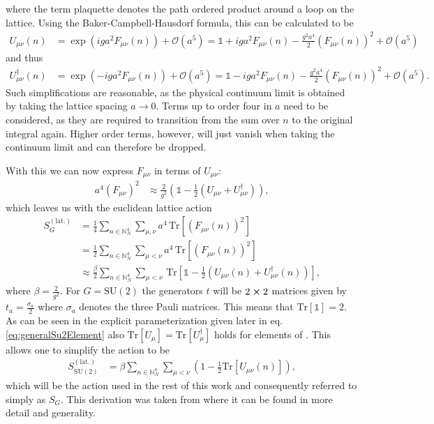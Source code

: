 where the term plaquette denotes the path ordered product around a loop on the lattice. Using the Baker-Campbell-Hausdorf formula, this can be calculated to be
\begin{align*}
 U_{\mu \nu}(n) & = \exp \left( iga^2 F_{\mu \nu} (n) \right) + \mathcal{O}(a^5) = \mathbb{1} + i g a^2 F_{\mu \nu} (n) - \frac{g^2 a^4}{2} (F_{\mu \nu} (n))^2 + \mathcal{O}(a^5)
\end{align*}
and thus
\begin{align*}
 U_{\mu \nu}^\dagger(n) & = \exp \left( - iga^2 F_{\mu \nu} (n) \right) + \mathcal{O}(a^5) = \mathbb{1} - i g a^2 F_{\mu \nu} (n) - \frac{g^2 a^4}{2} (F_{\mu \nu} (n) )^2 + \mathcal{O}(a^5) \textrm{.}
\end{align*}
Such simplifications are reasonable, as the physical continuum limit is obtained by taking the lattice spacing $a \rightarrow 0$. Terms up to order four in $a$ need to be considered, as they are required to transition from the sum over $n$ to the original integral again. Higher order terms, however, will just vanish when taking the continuum limit and can therefore be dropped.

With this we can now express $F_{\mu \nu}$ in terms of $U_{\mu \nu}$:
\begin{align*}
 a^4 (F_{\mu \nu})^2 & \approx \frac{2}{g^2} \left( \mathbb{1} - \frac{1}{2}\left( U_{\mu \nu} + U_{\mu \nu}^\dagger \right) \right) \textrm{,}
\end{align*}
which leaves us with the euclidean lattice action
\begin{align*}
 S^{(\textrm{lat.})}_G & = \frac{1}{4} \sum_{n \in \mathbb{N}^4_N} \sum_{\mu,\nu} a^4 \, \mathrm{Tr} \left[ \left( F_{\mu \nu} (n) \right)^2  \right]                                                        \\
                       & = \frac{1}{2} \sum_{n \in \mathbb{N}^4_N} \sum_{\mu < \nu}  a^4 \, \mathrm{Tr} \left[ \left( F_{\mu \nu} (n) \right)^2  \right]                                                     \\
                       & \approx \frac{\beta}{2} \sum_{n \in \mathbb{N}^4_N} \sum_{\mu < \nu} \, \mathrm{Tr} \left[ \mathbb{1} - \frac{1}{2}\left( U_{\mu \nu} (n) + U_{\mu \nu}^\dagger (n) \right) \right] \textrm{,}
\end{align*}
where $\beta = \frac{2}{g^2}$. For $G=\mathrm{SU}(2)$ the generators $t$ will be $2 \cross 2$ matrices given by $t_a = \frac{\sigma_a}{2}$ where $\sigma_a$ denotes the three Pauli matrices. This means that $\mathrm{Tr}\left[ \mathbb{1} \right] = 2$. As can be seen in the explicit parameterization given later in eq.  \ref{eq:generalSu2Element} also $ \mathrm{Tr} \left[ U_\mu \right] = \mathrm{Tr} \left[ U_\mu^\dagger \right] $ holds for elements of \SUTwo. This allows one to simplify the action to be
\begin{align*}
 S^{(\textrm{lat.})}_{\mathrm{SU}(2)} & = \beta \sum_{n \in \mathbb{N}^4_N} \sum_{\mu < \nu} \left( 1 - \frac{1}{2} \mathrm{Tr} \left[ U_{\mu \nu} (n) \right] \right) \textrm{,}
\end{align*}
which will be the action used in the rest of this work and consequently referred to simply as $S_G$. This derivation was taken from \cite{rothe:2005} where it can be found in more detail and generality.
